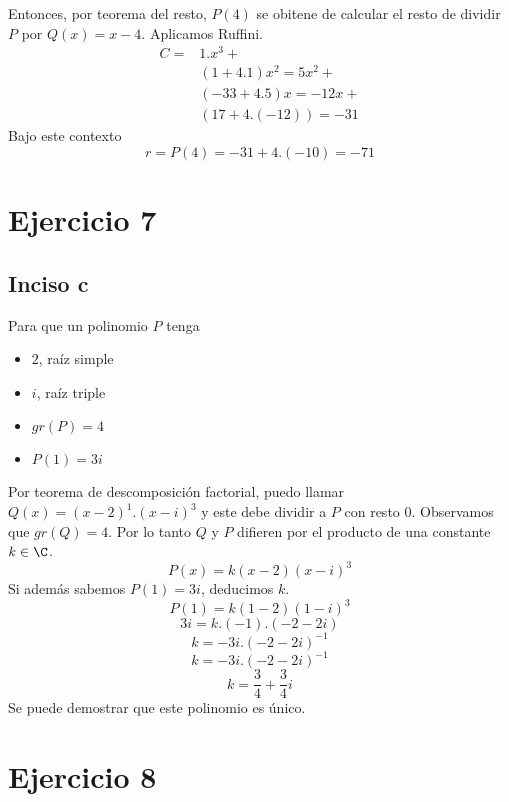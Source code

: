 \documentclass[10pt]{article}
\begin{document}
Entonces, por teorema del resto, $P(4)$ se obitene de calcular el resto de dividir $P$ por $Q(x) = x - 4$. Aplicamos Ruffini.
\begin{align}
	C =& 1.x^3 +\\
	& (1 + 4.1)x^2 = 5x^2 +\\
	& (-33 + 4.5)x = -12x +\\
	& (17 + 4.(-12)) = -31
\end{align}
Bajo este contexto
$$r = P(4) = -31 + 4.(-10) = -71$$

\section{Ejercicio 7}
\subsection{Inciso c}

Para que un polinomio $P$ tenga
\begin{itemize}
	\item $2$, raíz simple
	\item $i$, raíz triple
	\item $gr(P) = 4$
	\item $P(1) = 3i$
\end{itemize}

Por teorema de descomposición factorial, puedo llamar $Q(x) = (x-2)^1.(x-i)^3$ y este debe dividir a $P$ con resto 0. Observamos que $gr(Q) = 4$. Por lo tanto $Q$ y $P$ difieren por el producto de una constante $k \in \C$.
$$P(x) = k(x-2)(x-i)^3$$
Si además sabemos $P(1) = 3i$, deducimos $k$.
$$P(1) = k(1-2)(1-i)^3$$
$$3i = k.(-1).(-2-2i)$$
$$k = -3i.(-2-2i)^{-1}$$
$$k = -3i.(-2-2i)^{-1}$$
$$k = \dfrac{3}{4} + \dfrac{3}{4}i$$
Se puede demostrar que este polinomio es único.

\section{Ejercicio 8}
\end{document}
